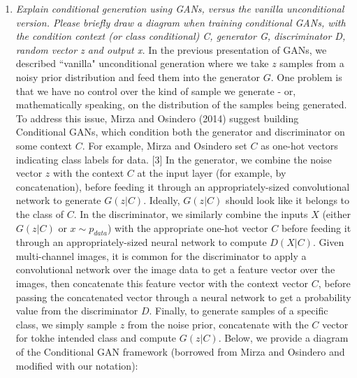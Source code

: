 \documentclass[a4paper]{article}
\begin{document}
\begin{enumerate}
{}
\item{\textit{Explain conditional generation using GANs, versus the vanilla unconditional version. Please briefly draw a diagram when training conditional GANs, with the condition context (or class conditional) C, generator G, discriminator D, random vector z and output x.}
\newline
\newline
In the previous presentation of GANs, we described ``vanilla" unconditional generation where we take $z$ samples from a noisy prior distribution and feed them into the generator $G$. One problem is that we have no control over the kind of sample we generate - or, mathematically speaking, on the distribution of the samples being generated. 
\newline
\newline
To address this issue, Mirza and Osindero (2014) suggest building Conditional GANs, which condition both the generator and discriminator on some context $C$. For example, Mirza and Osindero set $C$ as one-hot vectors indicating class labels for data. [3]
\newline
\newline
In the generator, we combine the noise vector $z$ with the context $C$ at the input layer (for example, by concatenation), before feeding it through an appropriately-sized convolutional network to generate $G(z|C)$. Ideally, $G(z|C)$ should look like it belongs to the class of $C$. In the discriminator, we similarly combine the inputs $X$ (either $G(z|C)$ or $x \sim p_{data}$) with the appropriate one-hot vector $C$ before feeding it through an appropriately-sized neural network to compute $D(X|C)$. Given multi-channel images, it is common for the discriminator to apply a convolutional network over the image data to get a feature vector over the images, then concatenate this feature vector with the context vector $C$, before passing the concatenated vector through a neural network to get a probability value from the discriminator $D$. Finally, to generate samples of a specific class, we simply sample $z$ from the noise prior, concatenate with the $C$ vector for tokhe intended class and compute $G(z|C)$. 
\newline
\newline
Below, we provide a diagram of the Conditional GAN framework (borrowed from Mirza and Osindero and modified with our notation):
\begin{figure}[H]

\end{figure}}
\end{enumerate}
\end{document}
